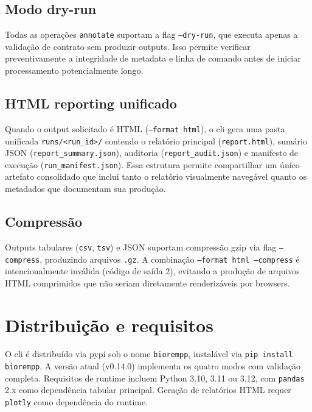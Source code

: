 \subsection{Modo dry-run}

Todas as operações \texttt{annotate} suportam a flag \texttt{--dry-run}, que executa apenas a validação de contrato sem produzir outputs. Isso permite verificar preventivamente a integridade de metadata e linha de comando antes de iniciar processamento potencialmente longo.

\subsection{HTML reporting unificado}

Quando o output solicitado é HTML (\texttt{--format html}), o \gls{cli} gera uma pasta unificada \texttt{runs/<run\_id>/} contendo o relatório principal (\texttt{report.html}), sumário JSON (\texttt{report\_summary.json}), auditoria (\texttt{report\_audit.json}) e manifesto de execução (\texttt{run\_manifest.json}). Essa estrutura permite compartilhar um único artefato consolidado que inclui tanto o relatório visualmente navegável quanto os metadados que documentam sua produção.

\subsection{Compressão}

Outputs tabulares (\texttt{csv}, \texttt{tsv}) e JSON suportam compressão gzip via flag \texttt{--compress}, produzindo arquivos \texttt{.gz}. A combinação \texttt{--format html --compress} é intencionalmente inválida (código de saída 2), evitando a produção de arquivos HTML comprimidos que não seriam diretamente renderizáveis por browsers.

\section{Distribuição e requisitos}
\label{sec:c4-distribuicao}

O \gls{cli} é distribuído via \gls{pypi} sob o nome \texttt{biorempp}, instalável via \texttt{pip install biorempp}. A versão atual (v0.14.0) implementa os quatro modos com validação completa. Requisitos de runtime incluem Python 3.10, 3.11 ou 3.12, com \texttt{pandas} 2.x como dependência tabular principal. Geração de relatórios HTML requer \texttt{plotly} como dependência do runtime.

